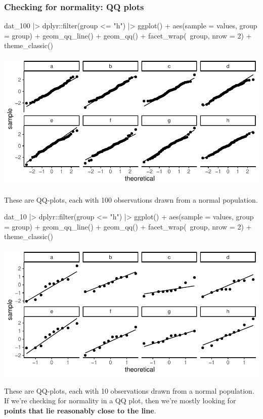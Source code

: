 \documentclass[a4paper]{article}\usepackage[]{graphicx}\usepackage[]{xcolor}
\makeatletter
\def\maxwidth{ %
  \ifdim\Gin@nat@width>\linewidth
    \linewidth
  \else
    \Gin@nat@width
  \fi
}
\makeatother
\begin{document}
\subsubsection{Checking for normality: QQ plots}
\begin{Schunk}
\begin{Sinput}
dat_100 |> dplyr::filter(group <= "h") |> 
  ggplot() + 
  aes(sample = values, group = group) + 
  geom_qq_line() + geom_qq() + 
  facet_wrap(~group, nrow = 2) +
  theme_classic()
\end{Sinput}


{\centering \includegraphics[width=\maxwidth]{figure/listings-unnamed-chunk-105-1} 

}

\end{Schunk}
These are QQ-plots, each with \textcolor{mygreen}{100} observations drawn from a normal population.
\begin{Schunk}
\begin{Sinput}
dat_10 |> dplyr::filter(group <= "h") |> 
  ggplot() + 
  aes(sample = values, group = group) + 
  geom_qq_line() + geom_qq() + 
  facet_wrap(~group, nrow = 2) +
  theme_classic()
\end{Sinput}


{\centering \includegraphics[width=\maxwidth]{figure/listings-unnamed-chunk-106-1} 

}

\end{Schunk}
These are QQ-plots, each with \textcolor{mygreen}{10} observations drawn from a normal population.\\
If we're checking for normality in a QQ plot, then we're mostly looking for \textbf{points that lie reasonably close to the line}.
\end{document}
